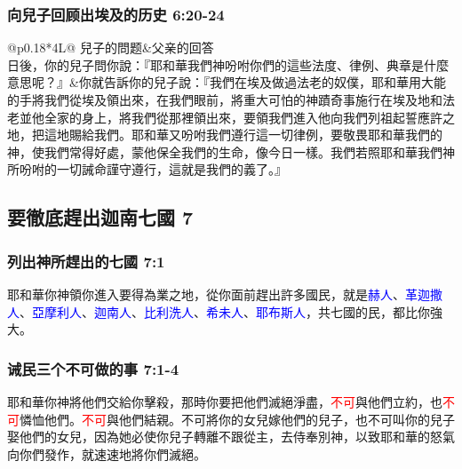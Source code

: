 \subsubsection{向兒子回顾出埃及的历史 6:20-24}
\begin{table}[H]
\begin{threeparttable}
\begin{tabular}{@{}p{}*{4}{L{\tabcolsep\relax}}@{}}
\toprule
兒子的問题&父亲的回答\\\hline
日後，你的兒子問你說：『耶和華我們神吩咐你們的這些法度、律例、典章是什麼意思呢？』&你就告訴你的兒子說：『我們在埃及做過法老的奴僕，耶和華用大能的手將我們從埃及領出來，在我們眼前，將重大可怕的神蹟奇事施行在埃及地和法老並他全家的身上，將我們從那裡領出來，要領我們進入他向我們列祖起誓應許之地，把這地賜給我們。耶和華又吩咐我們遵行這一切律例，要敬畏耶和華我們的神，使我們常得好處，蒙他保全我們的生命，像今日一樣。我們若照耶和華我們神所吩咐的一切誡命謹守遵行，這就是我們的義了。』\tabularnewline\hline
\bottomrule
\end{tabular}
\caption{向兒子回顾出埃及的历史}
\end{threeparttable}
\end{table} 

\subsection{要徹底趕出迦南七國 7}
\subsubsection{列出神所趕出的七國 7:1}
耶和華你神領你進入要得為業之地，從你面前趕出許多國民，就是\textcolor{blue}{赫人}、\textcolor{blue}{革迦撒人}、\textcolor{blue}{亞摩利人}、\textcolor{blue}{迦南人}、\textcolor{blue}{比利洗人}、\textcolor{blue}{希未人}、\textcolor{blue}{耶布斯人}，共七國的民，都比你強大。

\subsubsection{诫民三个不可做的事 7:1-4}
耶和華你神將他們交給你擊殺，那時你要把他們滅絕淨盡，\textcolor{red}{不可}與他們立約，也\textcolor{red}{不可}憐恤他們。\textcolor{red}{不可}與他們結親。不可將你的女兒嫁他們的兒子，也不可叫你的兒子娶他們的女兒，因為她必使你兒子轉離不跟從主，去侍奉別神，以致耶和華的怒氣向你們發作，就速速地將你們滅絕。 

